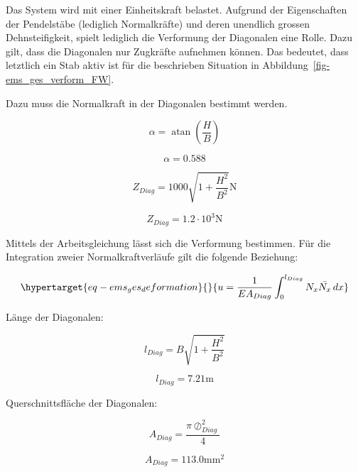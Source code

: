 \documentclass[
  letterpaper,
  DIV=11]{scrreprt}
\begin{document}
Das System wird mit einer Einheitskraft belastet. Aufgrund der
Eigenschaften der Pendelstäbe (lediglich Normalkräfte) und deren
unendlich grossen Dehnsteifigkeit, spielt lediglich die Verformung der
Diagonalen eine Rolle. Dazu gilt, dass die Diagonalen nur Zugkräfte
aufnehmen können. Das bedeutet, dass letztlich ein Stab aktiv ist für
die beschrieben Situation in Abbildung~\ref{fig-ems_ges_verform_FW}.

Dazu muss die Normalkraft in der Diagonalen bestimmt werden.

\begin{equation}\alpha = \operatorname{atan}{\left(\frac{H}{B} \right)}\end{equation}

\begin{equation}\alpha = 0.588\end{equation}

\begin{equation}Z_{Diag} = 1000 \sqrt{1 + \frac{H^{2}}{B^{2}}} \text{N}\end{equation}

\begin{equation}Z_{Diag} = 1.2 \cdot 10^{3} \text{N}\end{equation}

Mittels der Arbeitsgleichung lässt sich die Verformung bestimmen. Für
die Integration zweier Normalkraftverläufe gilt die folgende Beziehung:

\begin{equation}\protect\hypertarget{eq-ems_ges_deformation}{}{
u = \frac{1}{EA_{Diag}}  \int_{0}^{l_{Diag}} N_x\bar{N_x} \,dx
}\label{eq-ems_ges_deformation}\end{equation}

Länge der Diagonalen:

\begin{equation}l_{Diag} = B \sqrt{1 + \frac{H^{2}}{B^{2}}}\end{equation}

\begin{equation}l_{Diag} = 7.21 \text{m}\end{equation}

Querschnittsfläche der Diagonalen:

\begin{equation}A_{Diag} = \frac{\pi \oslash_{Diag}^{2}}{4}\end{equation}

\begin{equation}A_{Diag} = 113.0 \text{mm}^{2}\end{equation}
\end{document}
